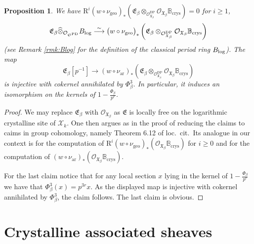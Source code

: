 \documentclass[asterisque,english]{smfart}
\newtheorem{proposition}[theo]{Proposition}
\begin{document}
\begin{proposition}\label{prop:phi-1inv} We have $\mathrm{R}^i (w\circ \nu_{\mathrm{geo}})_\ast\left( \mathfrak{E}_\beta\otimes_{\mathcal{O}_{\mathfrak{X}_\beta}^{\mathrm{DP}}}\mathcal{O}_{\mathfrak{X}_\beta}\mathbb{B}_{\mathrm{crys}}\right) =0 $ for $ i\geq 1$, $$\mathfrak{E}_\beta\widehat{\otimes}_{\mathcal{O}_{\mathfrak{S}^{\rm PD}}} B_{\mathrm{log}}\stackrel{\sim}{\longrightarrow}\bigl(w\circ \nu_{\mathrm{geo}}\bigr)_\ast\left( \mathfrak{E}_\beta\otimes_{\mathcal{O}_{\mathfrak{X}_\beta}^{\mathrm{DP}}}\mathcal{O}_{\mathfrak{X}_\beta}\mathbb{B}_{\mathrm{crys}}\right) $$ (see Remark \ref{rmk:Blog} for the definition of the classical period ring $B_{\rm log}$).  The map $$\mathfrak{E}_\beta[p^{-1}] \longrightarrow  (w\circ \nu_{\mathrm{ar}})_\ast\left( \mathfrak{E}_\beta\otimes_{\mathcal{O}_{\mathfrak{X}_\beta}^{\mathrm{DP}}}\mathcal{O}_{\mathfrak{X}_\beta}\mathbb{B}_{\mathrm{crys}}\right)$$is injective with cokernel annihilated by $\Phi_\beta^3$. In particular,  it induces an isomorphism on the kernels of $1 -\frac{\Phi_\beta}{p^r}$.

\end{proposition} 
\begin{proof} We may replace $\mathfrak{E}_\beta$ with $\mathcal{O}_{\mathfrak{X}_\beta}$ as $\mathfrak{E}$ is locally free on the logarithmic crystalline site of $\mathcal{X}_k$. One then argues as in the proof of \cite[Lemma 5.3]{TT} reducing the claims to  caims in group cohomology, namely Theorem 6.12 of loc.~cit.~Its analogue in our context is \cite[Thm.~3.39]{AI} for the computation of  $\mathrm{R}^i (w\circ \nu_{\mathrm{geo}})_\ast \left(\mathcal{O}_{\mathfrak{X}_\beta}\mathbb{B}_{\mathrm{crys}}\right)$ for $i\geq 0$  and \cite[Prop. 3.40]{AI} for the computation of $  (w\circ \nu_{\mathrm{ar}})_\ast\left(\mathcal{O}_{\mathfrak{X}_\beta}\mathbb{B}_{\mathrm{crys}}\right)$.

For the last claim notice that for any local section $x$ lying in the kernel of $1 -\frac{\Phi_\beta}{p^r}$ we have that $\Phi^3_\beta(x)=p^{3r} x$. As the displayed map  is injective with cokernel annihilated by $\Phi_\beta^3$, the claim follows. The last claim is obvious.
\end{proof}





\section{Crystalline associated sheaves}\label{sec:comparison}
\end{document}
